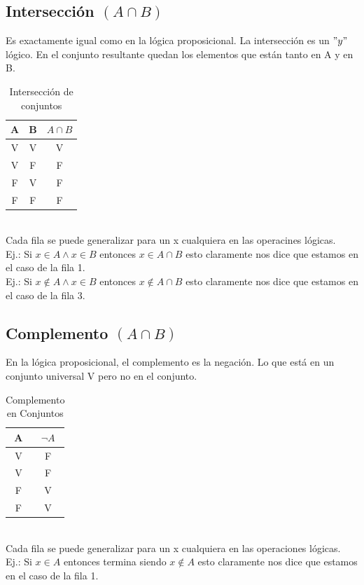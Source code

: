 \documentclass[10pt,a4paper]{article}
\begin{document}
\subsection*{Intersección $(A \cap B)$}
Es exactamente igual como en la lógica proposicional. La intersección es un $"y"$ lógico. En el conjunto resultante quedan los elementos que están tanto en A y en B.
\begin{table}[h!]
    \centering
    \begin{tabular}{|c | c | c|}
    \hline
    \textbf{A} & \textbf{B} & \textbf{$A \cap B$} \\[0.1cm]
    \hline
    V & V & V \\
    V & F & F \\
    F & V & F \\
    F & F & F \\
    \hline
    \end{tabular}
    \caption{Intersección de conjuntos}
\end{table} \\
Cada fila se puede generalizar para un x cualquiera en las operacines lógicas. \\
Ej.: Si $x \in A \land x \in B$ entonces $ x \in A \cap B$ esto claramente nos dice que estamos en el caso de la fila 1. \\
Ej.: Si $x \notin A \land x \in B$ entonces $ x \notin A \cap B$ esto claramente nos dice que estamos en el caso de la fila 3.
\subsection*{Complemento $(A \cap B)$}
En la lógica proposicional, el complemento es la negación. Lo que está en un conjunto universal V pero no en el conjunto.
\begin{table}[h!]
    \centering
    \begin{tabular}{|c | c|}
    \hline
    \textbf{A} & \textbf{$\neg A$} \\[0.1cm]
    \hline
    V & F \\
    V & F  \\
    F & V  \\
    F & V \\
    \hline
    \end{tabular}
    \caption{Complemento en Conjuntos}
\end{table} \\
Cada fila se puede generalizar para un x cualquiera en las operaciones lógicas. \\
Ej.: Si $x \in A$ entonces termina siendo $ x \notin A$ esto claramente nos dice que estamos en el caso de la fila 1. \\
\end{document}
